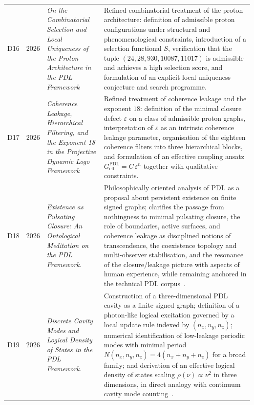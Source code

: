 \documentclass{article}
\newcommand{\PDL}{\mathrm{PDL}}
\begin{document}
\begin{longtable}{@{}llL{4cm}p{9.5cm}@{}}
D16 & 2026 & \textit{On the Combinatorial Selection and Local Uniqueness of the Proton Architecture in the PDL Framework} &
Refined combinatorial treatment of the proton architecture: definition of admissible proton configurations under structural and phenomenological constraints, introduction of a selection functional $S$, verification that the tuple $(24,28,930,10087,11017)$ is admissible and achieves a high selection score, and formulation of an explicit local uniqueness conjecture and search programme. \citep{Proton_Local_Uniqueness_2026,Combinatorial_Proton_v2_2026} \\[0.5em]

D17 & 2026 & \textit{Coherence Leakage, Hierarchical Filtering, and the Exponent 18 in the Projective Dynamic Logo Framework} &
Refined treatment of coherence leakage and the exponent $18$: definition of the minimal closure defect $\varepsilon$ on a class of admissible proton graphs, interpretation of $\varepsilon$ as an intrinsic coherence leakage parameter, organisation of the eighteen coherence filters into three hierarchical blocks, and formulation of an effective coupling ansatz $G_{\mathrm{eff}}^{\PDL}=C\,\varepsilon^{n}$ together with qualitative constraints. \citep{Coherence_Leakage_18_2026,Topological_Reformulation_PDL_2026,Effective_Fields_PDL_2026} \\[0.5em]

D18 &
2026 &
\emph{Existence as Pulsating Closure: An Ontological Meditation on the PDL Framework.} & 
Philosophically oriented analysis of PDL as a proposal about persistent existence on finite signed graphs; clarifies the passage from nothingness to minimal pulsating closure, the role of boundaries, active surfaces, and coherence leakage as disciplined notions of transcendence, the coexistence topology and multi-observer stabilisation, and the resonance of the closure/leakage picture with aspects of human experience, while remaining anchored in the technical PDL corpus~\citep{ExistencePulsatingClosure2026}.\\[0.4em]

D19 &
2026 &
\emph{Discrete Cavity Modes and Logical Density of States in the PDL Framework.}
 & Construction of a three-dimensional PDL cavity as a finite signed graph; definition of a photon-like logical excitation governed by a local update rule indexed by $(n_x,n_y,n_z)$; numerical identification of low-leakage periodic modes with minimal period $N(n_x,n_y,n_z)=4(n_x+n_y+n_z)$ for a broad family; and derivation of an effective logical density of states scaling $\rho(\nu)\propto \nu^2$ in three dimensions, in direct analogy with continuum cavity mode counting~\citep{PDLCavityModes2026}.\\[0.4em]


\end{longtable}
\end{document}
